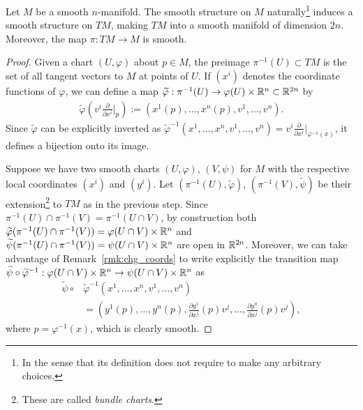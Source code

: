 \begin{theorem}\label{thm:tgbdlsmoothmfld}
	Let $M$ be a smooth $n$-manifold.
	The smooth structure on $M$ naturally\footnote{In the sense that its definition does not require to make any arbitrary choices.} induces a smooth structure on $TM$, making $TM$ into a smooth manifold of dimension $2n$.
	Moreover, the map $\pi: TM \to M$ is smooth.
\end{theorem}
\begin{proof}
	Given a chart $(U,\varphi)$ about $p\in M$, the preimage $\pi^{-1}(U) \subset TM$ is the set of all tangent vectors to $M$ at points of $U$.
	If $(x^i)$ denotes the coordinate functions of $\varphi$, we can define a map $\widetilde\varphi : \pi^{-1}(U) \to \varphi(U)\times\mathbb{R}^n \subset \mathbb{R}^{2n}$ by
	\begin{align}\label{eq:nat_coords}
		\widetilde\varphi\left(v^i \frac{\partial}{\partial x^i}\Big|_p\right) := \left(x^1(p), \ldots, x^n(p), v^1, \ldots, v^n\right).
	\end{align}
	Since $\widetilde\varphi$ can be explicitly inverted as $\widetilde\varphi^{-1}\left(x^1, \ldots, x^n, v^1, \ldots, v^n\right) = v^i \frac{\partial}{\partial x^i}\Big|_{\varphi^{-1}(x)}$, it defines a bijection onto its image.

	Suppose we have two smooth charts $(U,\varphi)$, $(V,\psi)$ for $M$ with the respective local coordinates $(x^i)$ and $(y^i)$.
	Let $(\pi^{-1}(U),\widetilde\varphi)$, $(\pi^{-1}(V),\widetilde\psi)$ be their extension\footnote{These are called \emph{bundle charts}.} to $TM$ as in the previous step.
	Since $\pi^{-1}(U)\cap\pi^{-1}(V) = \pi^{-1}(U\cap V)$, by construction both $\widetilde\varphi(\pi^{-1}(U)\cap\pi^{-1}(V)) = \varphi(U\cap V)\times\mathbb{R}^n$ and $\widetilde\psi(\pi^{-1}(U)\cap\pi^{-1}(V)) = \psi(U\cap V)\times\mathbb{R}^n$ are open in $\mathbb{R}^{2n}$.
	Moreover, we can take advantage of Remark~\ref{rmk:chg_coords} to write explicitly the transition map  $\widetilde\psi\circ\widetilde\varphi^{-1}: \varphi(U\cap V)\times\mathbb{R}^n \to \psi(U\cap V)\times\mathbb{R}^n$ as
	\begin{align}
		\widetilde\psi\circ & \widetilde\varphi^{-1}\left(x^1, \ldots, x^n, v^1, \ldots, v^n\right)                                                            \\
		                    & =\left(y^1(p),\ldots, y^n(p), \frac{\partial y^1}{\partial x^j}(p) v^j, \ldots, \frac{\partial y^n}{\partial x^j}(p) v^j\right),
	\end{align}
	where $p = \varphi^{-1}(x)$, which is clearly smooth.


\end{proof}
